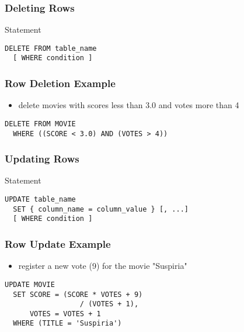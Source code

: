 \documentclass[dvipsnames]{beamer}
\theoremstyle{plain}
\begin{document}
\begin{frame}[fragile]
  \frametitle{Deleting Rows}

  \begin{block}{Statement}
    \begin{lstlisting}
DELETE FROM table_name
  [ WHERE condition ]
    \end{lstlisting}
  \end{block}
\end{frame}

\begin{frame}[fragile]
  \frametitle{Row Deletion Example}

  \begin{example}
    \begin{itemize}
      \item delete movies with scores less than 3.0 and votes more than 4
    \end{itemize}

    \begin{lstlisting}
DELETE FROM MOVIE
  WHERE ((SCORE < 3.0) AND (VOTES > 4))
    \end{lstlisting}
  \end{example}
\end{frame}

\begin{frame}[fragile]
  \frametitle{Updating Rows}

  \begin{block}{Statement}
    \begin{lstlisting}
UPDATE table_name
  SET { column_name = column_value } [, ...]
  [ WHERE condition ]
    \end{lstlisting}
  \end{block}
\end{frame}

\begin{frame}[fragile]
  \frametitle{Row Update Example}

  \begin{example}
    \begin{itemize}
      \item register a new vote (9) for the movie "Suspiria"
    \end{itemize}

    \begin{lstlisting}
UPDATE MOVIE
  SET SCORE = (SCORE * VOTES + 9)
                  / (VOTES + 1),
      VOTES = VOTES + 1
  WHERE (TITLE = 'Suspiria')
    \end{lstlisting}
  \end{example}
\end{frame}
\end{document}
